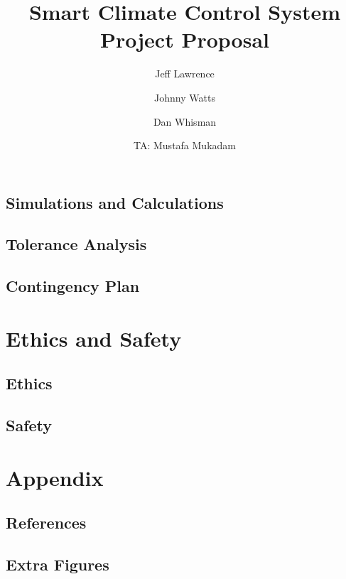 \documentclass[titlepage]{article}
\title{Smart Climate Control System\\Project Proposal}
\author{Jeff Lawrence
   \and Johnny Watts
   \and Dan Whisman
   \and TA: Mustafa Mukadam}
\begin{document}
\maketitle

\setcounter{secnumdepth}{5}

\tableofcontents







\subsection{Simulations and Calculations}




\subsection{Tolerance Analysis}



\subsection{Contingency Plan}

\section{Ethics and Safety}
\subsection{Ethics}
\subsection{Safety}

\section{Appendix}
\subsection{References}
\subsection{Extra Figures}
\end{document}

